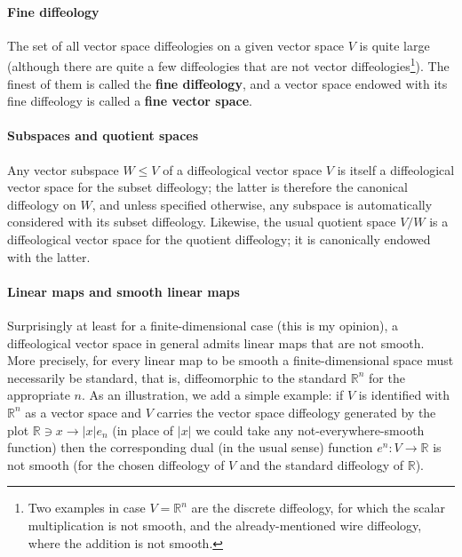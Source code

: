 \documentclass{article}
\newcommand\matR{{\mathbb{R}}}
\begin{document}
\paragraph{Fine diffeology} The set of all vector space diffeologies on a given vector space $V$ is quite large (although there are quite a few diffeologies that are not vector diffeologies\footnote{Two examples 
in case $V=\matR^n$ are the discrete diffeology, for which the scalar multiplication is not smooth, and the already-mentioned wire diffeology, where the addition is not smooth.}). The finest of them is called
the \textbf{fine diffeology}, and a vector space endowed with its fine diffeology is called a \textbf{fine vector space}.

\paragraph{Subspaces and quotient spaces} Any vector subspace $W\leqslant V$ of a diffeological vector space $V$ is itself a diffeological vector space for the subset diffeology; the latter is therefore the
canonical diffeology on $W$, and unless specified otherwise, any subspace is automatically considered with its subset diffeology. Likewise, the usual quotient space $V/W$ is a diffeological vector space for 
the quotient diffeology; it is canonically endowed with the latter.

\paragraph{Linear maps and smooth linear maps} Surprisingly at least for a finite-dimensional case (this is my opinion), a diffeological vector space in general admits linear maps that are not smooth. More
precisely, for every linear map to be smooth a finite-dimensional space must necessarily be standard, that is, diffeomorphic to the standard $\matR^n$ for the appropriate $n$. As an illustration, we add a 
simple example: if $V$ is identified with $\matR^n$ as a vector space and $V$ carries the vector space diffeology generated by the plot $\matR\ni x\to |x|e_n$ (in place of $|x|$ we could take
any not-everywhere-smooth function) then the corresponding dual (in the usual sense) function $e^n:V\to\matR$ is not smooth (for the chosen diffeology of $V$ and the standard diffeology of $\matR$).
\end{document}
